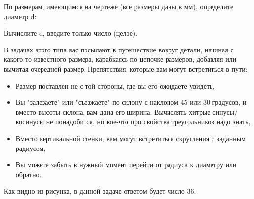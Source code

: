 
По размерам, имеющимся на чертеже (все размеры даны в мм), определите диаметр d:


Вычислите d, введите только число (целое).

\solutionSection

В задачах этого типа вас посылают в путешествие вокруг детали, начиная с какого-то известного размера, карабкаясь по цепочке размеров, добавляя или вычитая очередной размер.  Препятствия, которые вам могут встретиться в пути:
\begin{itemize}
    \item Размер поставлен не с той стороны, где вы его ожидаете увидеть,
    \item Вы "залезаете" или "съезжаете" по склону с наклоном 45 или 30 градусов, и вместо высоты склона, вам дана его ширина. Вычислять хитрые синусы/косинусы не понадобится, но кое-что про свойства треугольников надо знать,
    \item Вместо вертикальной стенки, вам могут встретиться скругления с заданным радиусом,
    \item Вы можете забыть в нужный момент перейти от радиуса к диаметру или обратно.
\end{itemize}


Как видно из рисунка, в данной задаче ответом будет число 36.

